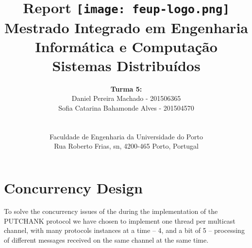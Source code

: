 \documentclass[a4paper]{article}
\begin{document}
\setlength{\textwidth}{16cm}
\setlength{\textheight}{22cm}

\title{\Huge\textbf{Report}\linebreak\linebreak\linebreak
\linebreak\linebreak
\texttt{[image: feup-logo.png]}\linebreak\linebreak
\linebreak\linebreak
\Large{Mestrado Integrado em Engenharia Informática e Computação} \linebreak\linebreak
\Large{Sistemas Distribuídos}\linebreak
}

\author{\textbf{Turma 5:}\\
Daniel Pereira Machado - 201506365 \\
\linebreak\linebreak
Sofia Catarina Bahamonde Alves - 201504570 \\
\linebreak\linebreak \\
\\ Faculdade de Engenharia da Universidade do Porto \\ Rua Roberto Frias, s\/n, 4200-465 Porto, Portugal \linebreak\linebreak\linebreak
\linebreak\linebreak\vspace{1cm}}

\maketitle
\thispagestyle{empty}


\newpage

\section*{Concurrency Design}

To solve the concurrency issues of the during the implementation of the PUTCHANK protocol we have chosen to implement one thread per multicast channel, with many protocols instances at a time – 4, and a bit of 5 – processing of different messages received on the same channel at the same time.
\linebreak
\end{document}
